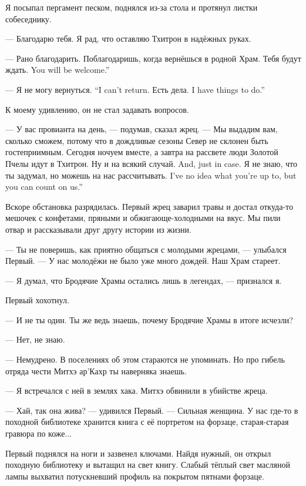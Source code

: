 Я посыпал пергамент песком, поднялся из-за стола и протянул листки собеседнику.

--- Благодарю тебя.
Я рад, что оставляю Тхитрон в надёжных руках.

--- Рано благодарить.
Поблагодаришь, когда вернёшься в родной Храм.
{Тебя будут ждать.}
{You will be welcome.''}

{--- Я не могу вернуться.}
{``I can't return.}
{Есть дела.}
{I have things to do.''}

К моему удивлению, он не стал задавать вопросов.

--- У вас провианта на день, --- подумав, сказал жрец.
--- Мы выдадим вам, сколько сможем, потому что в дождливые сезоны Север не склонен быть гостеприимным.
Сегодня ночуем вместе, а завтра на рассвете люди Золотой Пчелы идут в Тхитрон.
{Ну и на всякий случай.}
{And, just in case.}
{Я не знаю, что ты задумал, но можешь на нас рассчитывать.}
{I've no idea what you're up to, but you can count on us.''}

\asterism

Вскоре обстановка разрядилась.
Первый жрец заварил травы и достал откуда-то мешочек с конфетами, пряными и обжигающе-холодными на вкус.
Мы пили отвар и рассказывали друг другу истории из жизни.

--- Ты не поверишь, как приятно общаться с молодыми жрецами, --- улыбался Первый.
--- У нас молодёжи не было уже много дождей.
Наш Храм стареет.

--- Я думал, что Бродячие Храмы остались лишь в легендах, --- признался я.

Первый хохотнул.

--- И не ты один.
Ты же ведь знаешь, почему Бродячие Храмы в итоге исчезли?

--- Нет, не знаю.

--- Немудрено.
В поселениях об этом стараются не упоминать.
Но про гибель отряда чести Митхэ ар'Кахр ты наверняка знаешь.

--- Я встречался с ней в землях хака.
Митхэ обвинили в убийстве жреца.

--- Хай, так она жива? --- удивился Первый.
--- Сильная женщина.
У нас где-то в походной библиотеке хранится книга с её портретом на форзаце, старая-старая гравюра по коже...

Первый поднялся на ноги и зазвенел ключами.
Найдя нужный, он открыл походную библиотеку и вытащил на свет книгу.
Слабый тёплый свет масляной лампы выхватил потускневший профиль на покрытом пятнами форзаце.

